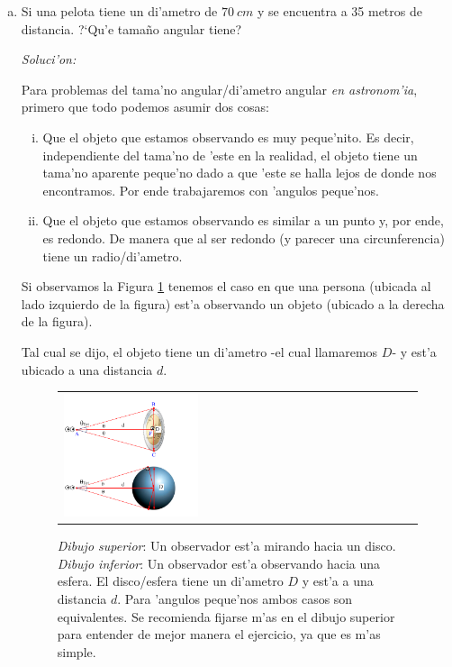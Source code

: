 \documentclass{article}
\begin{document}
\begin{enumerate} [a)]

\item Si una pelota tiene un di'ametro de $70 \ cm$ y se encuentra a 35 metros de distancia. ?`Qu'e tamaño angular tiene? 

\textit{Soluci'on:}

Para problemas del tama'no angular/di'ametro angular \emph{en astronom'ia}, primero que todo podemos asumir dos cosas:

\begin{enumerate} [i)]
\item Que el objeto que estamos observando es muy peque'nito. Es decir, independiente del tama'no de 'este en la realidad, el objeto tiene un tama'no aparente peque'no dado a que 'este se halla lejos de donde nos encontramos. Por ende trabajaremos con 'angulos peque'nos.
\item Que el objeto que estamos observando es similar a un punto y, por ende, es redondo. De manera que al ser redondo (y parecer una circunferencia) tiene un radio/di'ametro.

\end{enumerate}

Si observamos la Figura \ref{fig1} tenemos el caso en que una persona (ubicada al lado izquierdo de la figura) est'a observando un objeto (ubicado a la derecha de la figura).

Tal cual se dijo, el objeto tiene un di'ametro -el cual llamaremos $D$- y est'a ubicado a una distancia $d$. 

\begin{figure}[!ht]
\begin{center}
\begin{tabular}{ll}
  \includegraphics[width=0.4\textwidth]{Diametro_angular.png} 
\end{tabular}
\caption{{\small \textit{Dibujo superior}: Un observador est'a mirando hacia un disco. \textit{Dibujo inferior}: Un observador est'a observando hacia una esfera. El disco/esfera tiene un di'ametro $D$ y est'a a una distancia $d$.
Para 'angulos peque'nos ambos casos son equivalentes. Se recomienda fijarse m'as en el dibujo superior para entender de mejor manera el ejercicio, ya que es m'as simple.}}\label{fig1}
\end{center} 
\end{figure}



\end{enumerate}
\end{document}
